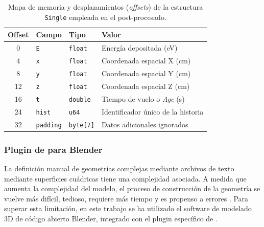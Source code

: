 \begin{table}[h]
  \centering
  \renewcommand{\arraystretch}{1.2}
  \begin{tabular}{c l l l}
    \hline
    \textbf{Offset} & \textbf{Campo}   & \textbf{Tipo}    & \textbf{Valor}                           \\
    \hline
    0               & \texttt{E}       & \texttt{float}   & Energía depositada (eV)                  \\
    4               & \texttt{x}       & \texttt{float}   & Coordenada espacial X (cm)               \\
    8               & \texttt{y}       & \texttt{float}   & Coordenada espacial Y (cm)               \\
    12              & \texttt{z}       & \texttt{float}   & Coordenada espacial Z (cm)               \\
    16              & \texttt{t}       & \texttt{double}  & Tiempo de vuelo o \textit{Age} (s)       \\
    24              & \texttt{hist}    & \texttt{u64}     & Identificador único de la historia       \\
    32              & \texttt{padding} & \texttt{byte[7]} & Datos adicionales ignorados\footnotemark \\
    \hline
  \end{tabular}
  \caption{Mapa de memoria y desplazamientos (\textit{offsets}) de la estructura \texttt{Single} empleada en el post-procesado.}
  \label{tab:single_offset}
\end{table}

\subsubsection{Plugin de \penred para Blender}

La definición manual de geometrías complejas mediante archivos de texto mediante superficies cuádricas tiene una complejidad asociada. A medida que aumenta la complejidad del modelo, el proceso de construcción de la geometría se vuelve más difícil, tedioso, requiere más tiempo y es propenso a errores \cite{Wilson2010}. Para superar esta limitación, en este trabajo se ha utilizado el software de modelado 3D de código abierto Blender, integrado con el plugin específico de \penred \cite{PenredBlender}.

